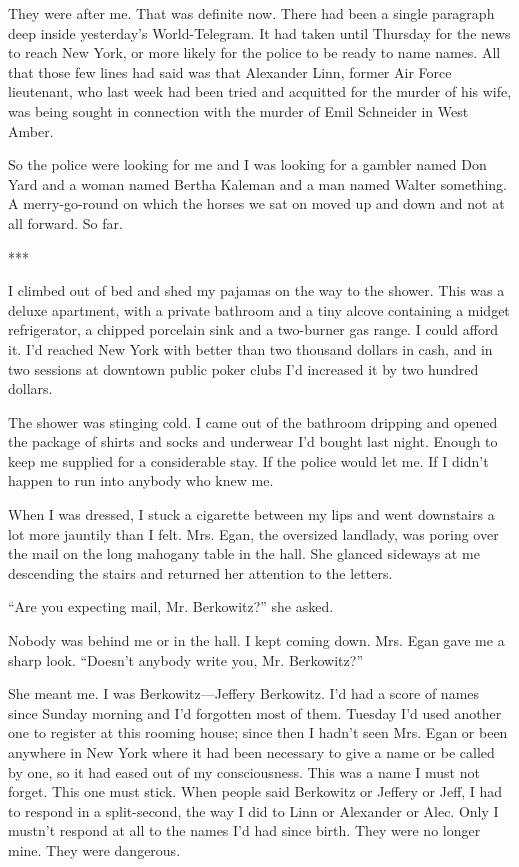 \documentclass{novel}
\begin{document}
{They were after me. That was definite now. There had been a single paragraph deep inside yesterday’s World-Telegram. It had taken until Thursday for the news to reach New York, or more likely for the police to be ready to name names. All that those few lines had said was that Alexander Linn, former Air Force lieutenant, who last week had been tried and acquitted for the murder of his wife, was being sought in connection with the murder of Emil Schneider in West Amber.

So the police were looking for me and I was looking for a gambler named Don Yard and a woman named Bertha Kaleman and a man named Walter something. A merry-go-round on which the horses we sat on moved up and down and not at all forward. So far.

***

I climbed out of bed and shed my pajamas on the way to the shower. This was a deluxe apartment, with a private bathroom and a tiny alcove containing a midget refrigerator, a chipped porcelain sink and a two-burner gas range. I could afford it. I’d reached New York with better than two thousand dollars in cash, and in two sessions at downtown public poker clubs I’d increased it by two hundred dollars.

The shower was stinging cold. I came out of the bathroom dripping and opened the package of shirts and socks and underwear I’d bought last night. Enough to keep me supplied for a considerable stay. If the police would let me. If I didn’t happen to run into anybody who knew me.

When I was dressed, I stuck a cigarette between my lips and went downstairs a lot more jauntily than I felt. Mrs. Egan, the oversized landlady, was poring over the mail on the long mahogany table in the hall. She glanced sideways at me descending the stairs and returned her attention to the letters.

“Are you expecting mail, Mr. Berkowitz?” she asked.

Nobody was behind me or in the hall. I kept coming down. Mrs. Egan gave me a sharp look. “Doesn’t anybody write you, Mr. Berkowitz?”

She meant me. I was Berkowitz—Jeffery Berkowitz. I’d had a score of names since Sunday morning and I’d forgotten most of them. Tuesday I’d used another one to register at this rooming house; since then I hadn’t seen Mrs. Egan or been anywhere in New York where it had been necessary to give a name or be called by one, so it had eased out of my consciousness. This was a name I must not forget. This one must stick. When people said Berkowitz or Jeffery or Jeff, I had to respond in a split-second, the way I did to Linn or Alexander or Alec. Only I mustn’t respond at all to the names I’d had since birth. They were no longer mine. They were dangerous.

}
\end{document}
